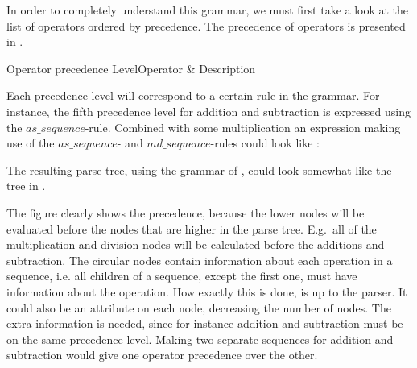 In order to completely understand this grammar, we must first take a look at the list of
operators ordered by precedence. The precedence of operators is presented in
.

                  {Operator precedence}
           {Level}{Operator & Description}{
}

Each precedence level will correspond to a certain rule in the grammar. For
instance, the fifth precedence level for addition and subtraction is expressed
using the $as\_sequence$-rule. Combined with some multiplication an expression
making use of the $as\_sequence$- and $md\_sequence$-rules could look like
:


The resulting parse tree, using the grammar of \productname{}, could look
somewhat like the tree in .



The figure clearly shows the precedence, because the lower nodes will be
evaluated before the nodes that are higher in the parse tree. E.g.\ all of the
multiplication and division nodes will be calculated before the additions and
subtraction. The circular nodes contain information about each operation in a
sequence, i.e. all children of a sequence, except the first one, must have
information about the operation. How exactly this is done, is up to the parser.
It could also be an attribute on each node, decreasing the number of nodes. The
extra information is needed, since for instance addition and subtraction must be
on the same precedence level. Making two separate sequences for addition and
subtraction would give one operator precedence over the other.


